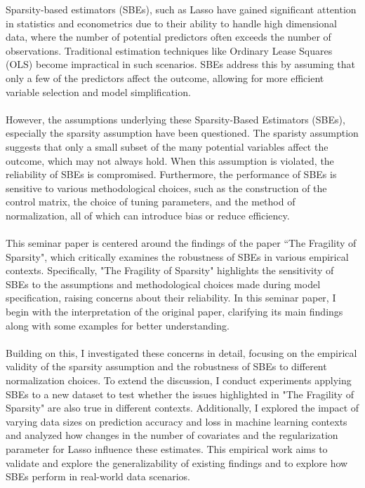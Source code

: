 Sparsity-based estimators (SBEs), such as Lasso have gained significant attention in statistics and econometrics due to their ability to handle high dimensional data, where the number of potential predictors often exceeds the number of observations. Traditional estimation techniques like Ordinary Lease Squares (OLS) become impractical in such scenarios. SBEs address this by assuming that only a few of the predictors affect the outcome, allowing for more efficient variable selection and model simplification.\\
\\
However, the assumptions underlying these Sparsity-Based Estimators (SBEs), especially the sparsity assumption have been questioned. The sparisty assumption suggests that only a small subset of the many potential variables affect the outcome, which may not always hold. When this assumption is violated, the reliability of SBEs is compromised. Furthermore, the performance of SBEs is sensitive to various methodological choices, such as the construction of the control matrix, the choice of tuning parameters, and the method of normalization, all of which can introduce bias or reduce efficiency. \\
\\
This seminar paper is centered around the findings of the paper ``The Fragility of Sparsity", which critically examines the robustness of SBEs in various empirical contexts. Specifically, "The Fragility of Sparsity" highlights the sensitivity of SBEs to the assumptions and methodological choices made during model specification, raising concerns about their reliability. In this seminar paper, I begin with the interpretation of the original paper, clarifying its main findings along with some examples for better understanding. \\
\\
Building on this, I investigated these concerns in detail, focusing on the empirical validity of the sparsity assumption and the robustness of SBEs to different normalization choices. To extend the discussion, I conduct experiments applying SBEs to a new dataset to test whether the issues highlighted in "The Fragility of Sparsity" are also true in different contexts. Additionally, I explored the impact of varying data sizes on prediction accuracy and loss in machine learning contexts and analyzed how changes in the number of covariates and the regularization parameter for Lasso influence these estimates. This empirical work aims to validate and explore the generalizability of existing findings and to explore how SBEs perform in real-world data scenarios.

